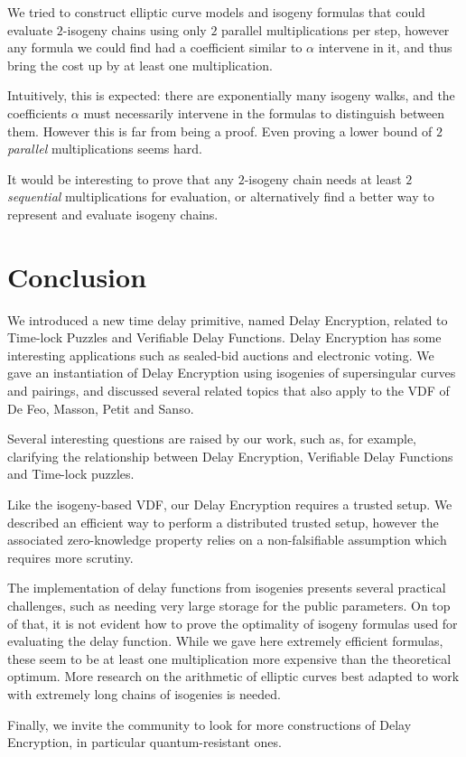 \documentclass{llncs}
\begin{document}
We tried to construct elliptic curve models and isogeny formulas that
could evaluate $2$-isogeny chains using only $2$ parallel
multiplications per step, however any formula we could find had a
coefficient similar to $\alpha$ intervene in it, and thus bring the
cost up by at least one multiplication.

Intuitively, this is expected: there are exponentially many isogeny
walks, and the coefficients $\alpha$ must necessarily intervene in the
formulas to distinguish between them. %
However this is far from being a proof. %
Even proving a lower bound of $2$ \emph{parallel} multiplications
seems hard.

It would be interesting to prove that any $2$-isogeny chain needs at
least $2$ \emph{sequential} multiplications for evaluation, or
alternatively find a better way to represent and evaluate isogeny
chains.


\section{Conclusion}

We introduced a new time delay primitive, named Delay Encryption,
related to Time-lock Puzzles and Verifiable Delay Functions. %
Delay Encryption has some interesting applications such as sealed-bid
auctions and electronic voting. %
We gave an instantiation of Delay Encryption using isogenies of
supersingular curves and pairings, and discussed several related
topics that also apply to the VDF of De Feo, Masson, Petit and Sanso.

Several interesting questions are raised by our work, such as, for
example, clarifying the relationship between Delay Encryption,
Verifiable Delay Functions and Time-lock puzzles.

Like the isogeny-based VDF, our Delay Encryption requires a trusted
setup. %
We described an efficient way to perform a distributed trusted setup,
however the associated zero-knowledge property relies on a
non-falsifiable assumption which requires more scrutiny.

The implementation of delay functions from isogenies presents several
practical challenges, such as needing very large storage for the
public parameters. %
On top of that, it is not evident how to prove the optimality of
isogeny formulas used for evaluating the delay function. %
While we gave here extremely efficient formulas, these seem to be at
least one multiplication more expensive than the theoretical
optimum. %
More research on the arithmetic of elliptic curves best adapted to
work with extremely long chains of isogenies is needed.

Finally, we invite the community to look for more constructions of
Delay Encryption, in particular quantum-resistant ones.

\def\doi#1{\href{https://doi.org/#1}{\tt https://doi.org/\nolinkurl{#1}}}


\end{document}
